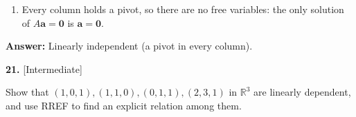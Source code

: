 \documentclass[11pt]{article}
\begin{document}
\begin{tcolorbox}[breakable,colback=ans,colframe=ansb,boxrule=0.5pt,left=4pt,right=4pt,top=2pt,bottom=2pt]
\begin{enumerate}[leftmargin=2.2em,itemsep=1pt,topsep=1pt,label=\textbf{Step \arabic*.}]
\item Every column holds a pivot, so there are no free variables: the only solution of $A\mathbf a=\mathbf 0$ is $\mathbf a=\mathbf 0$.
\end{enumerate}\textbf{Answer:} Linearly independent (a pivot in every column).\end{tcolorbox}
\par\vspace{2pt}
\begin{minipage}{\linewidth}\textbf{21.} \hfill{\scriptsize\color{ink}[Intermediate]}\par\nopagebreak Show that $(1,0,1),(1,1,0),(0,1,1),(2,3,1)$ in $\mathbb{R}^{3}$ are linearly dependent, and use RREF to find an explicit relation among them.
\end{minipage}\par\nopagebreak
\end{document}
